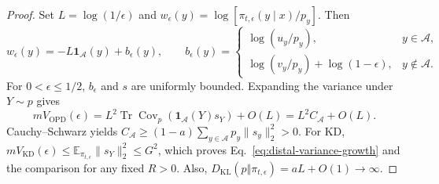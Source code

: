 \begin{proof}
Set $L=\log(1/\epsilon)$ and
$w_\epsilon(y)=\log[\pi_{t,\epsilon}(y\mid x)/p_y]$. Then
\begin{equation}
 w_\epsilon(y)=-L\mathbf1_{\mathcal A}(y)+b_\epsilon(y),
 \qquad
 b_\epsilon(y)=
 \begin{cases}
   \log(u_y/p_y),&y\in\mathcal A,\\
   \log(v_y/p_y)+\log(1-\epsilon),&y\notin\mathcal A.
 \end{cases}
 \label{eq:distal-weight-decomposition}
\end{equation}
For $0<\epsilon\le1/2$, $b_\epsilon$ and $s$ are uniformly bounded.
Expanding the variance under $Y\sim p$ gives
\begin{equation}
 mV_{\mathrm{OPD}}(\epsilon)
 =L^2\operatorname{Tr}\operatorname{Cov}_p
       (\mathbf1_{\mathcal A}(Y)s_Y)+O(L)
 =L^2 C_{\mathcal A}+O(L).
 \label{eq:distal-variance-expansion}
\end{equation}
Cauchy--Schwarz yields
$C_{\mathcal A}\ge(1-a)\sum_{y\in\mathcal A}p_y\|s_y\|_2^2>0$.
For KD,
$mV_{\mathrm{KD}}(\epsilon)
\le\mathbb E_{\pi_{t,\epsilon}}\|s_Y\|_2^2\le G^2$,
which proves Eq.~\eqref{eq:distal-variance-growth} and the comparison
for any fixed $R>0$. Also,
$D_{\mathrm{KL}}(p\Vert\pi_{t,\epsilon})=aL+O(1)\to\infty$.
\end{proof}
